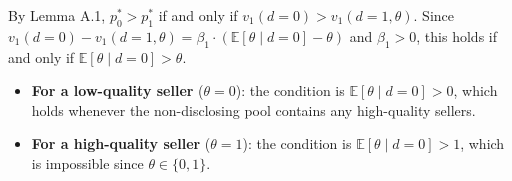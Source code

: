 By Lemma A.1, $p^*_0 > p^*_1$ if and only if $v_1(d=0) > v_1(d=1, \theta)$. Since $v_1(d=0) - v_1(d=1, \theta) = \beta_1 \cdot (\mathbb{E}[\theta \mid d=0] - \theta)$ and $\beta_1 > 0$, this holds if and only if $\mathbb{E}[\theta \mid d=0] > \theta$.

\begin{itemize}
    \item \textbf{For a low-quality seller} ($\theta = 0$): the condition is $\mathbb{E}[\theta \mid d=0] > 0$, which holds whenever the non-disclosing pool contains any high-quality sellers.
    \item \textbf{For a high-quality seller} ($\theta = 1$): the condition is $\mathbb{E}[\theta \mid d=0] > 1$, which is impossible since $\theta \in \{0,1\}$.
\end{itemize}
